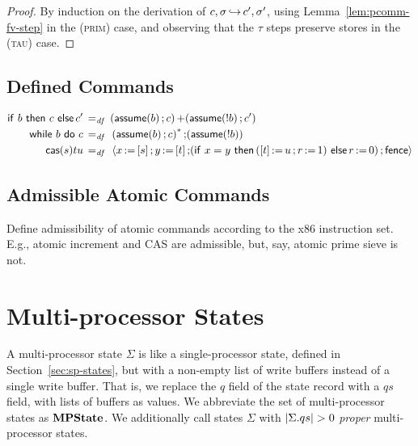 \documentclass[11pt]{report}
\begin{document}
\begin{proof}
	 By induction on the derivation of $c,\sigma \operatorname{\hookrightarrow} c',\sigma'$, using Lemma~\ref{lem:pcomm-fv-step} in the \textsc{(prim)} case, and observing that the $\tau$ steps preserve stores in the \textsc{(tau)} case.
\end{proof}



\subsection{Defined Commands} %
\label{sub:defined_commands}

\begin{align*}
	\operatorname{\mathsf{if\,}} b \operatorname{\mathsf{\,then\,}} c \operatorname{\mathsf{\,else}} c' \operatorname{\;=_{\mathit{df}}\;} {} & (\operatorname{\mathsf{assume}}(b) \operatorname{;} c) \operatorname{+} (\operatorname{\mathsf{assume}}(!b) \operatorname{;} c') \\
	\operatorname{\mathsf{while\,}} b \operatorname{\mathsf{\,do\,}} c \operatorname{\;=_{\mathit{df}}\;} {} & \left(\operatorname{\mathsf{assume}}(b) \operatorname{;} c\right)^{\operatorname{\ast}} \operatorname{;} (\operatorname{\mathsf{assume}}(!b)) \\
	\mathsf{cas}(s){t}{u} \operatorname{\;=_{\mathit{df}}\;} {} & \left\langle x \operatorname{:\!=} \left[ s \right] \operatorname{;} y \operatorname{:\!=} \left[ t \right] \operatorname{;} (\operatorname{\mathsf{if\,}} x = y \operatorname{\mathsf{\,then\,}} (\left[ t \right] \operatorname{:\!=} u \operatorname{;} r \operatorname{:\!=} 1) \operatorname{\mathsf{\,else}} r \operatorname{:\!=} 0) \operatorname{;} \operatorname{\mathsf{fence}} \right\rangle
\end{align*}





\subsection{Admissible Atomic Commands} %
\label{sub:admissible_atomic_commands}

Define admissibility of atomic commands according to the x86 instruction set. E.g., atomic increment and CAS are admissible, but, say, atomic prime sieve is not. 




\section{Multi-processor States} %
\label{sec:mp-states}

A multi-processor state $\Sigma$ is like a single-processor state, defined in Section~\ref{sec:sp-states}, but with a non-empty list of write buffers instead of a single write buffer. That is, we replace the $q$ field of the state record with a $qs$ field, with lists of buffers as values. We abbreviate the set of multi-processor states as $\mathbf{MPState}$. We additionally call states $\Sigma$ with $|\Sigma.qs| > 0$ \emph{proper} multi-processor states. 
\end{document}
